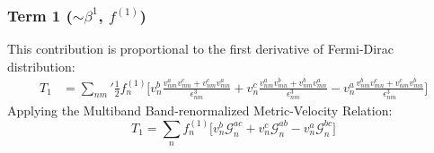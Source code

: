 \documentclass[twocolumn, prx, reprint, amsfonts, amsmath, amssymb, longbibliography, floatfix, aps]{revtex4-2}
\begin{document}
\subsubsection*{Term 1 (\texorpdfstring{$\sim \beta^1$}{beta1}, \texorpdfstring{$f^{(1)}$}{f1})}
This contribution is proportional to the first derivative of Fermi-Dirac distribution:
\begin{equation}
	\begin{aligned}
		T_1
		&= {\textstyle \sum_{nm}'}\frac{1}{2} f^{(1)}_n \Big[v^b_{n} \frac{v^a_{nm}v^c_{mn} + v^c_{nm}v^a_{mn}}{\epsilon_{nm}^3}  + v^c_{n} \frac{v^a_{nm}v^b_{mn} + v^b_{nm}v^a_{mn}}{\epsilon_{nm}^3} - v^a_{n} \frac{v^b_{nm}v^c_{mn} + v^c_{nm}v^b_{mn}}{\epsilon_{nm}^3} \Big]
	\end{aligned}
\end{equation}
Applying the Multiband Band-renormalized Metric-Velocity Relation:
\begin{equation}
	T_1 
	= {\textstyle \sum_{n}} f^{(1)}_n \Big[v^b_{n} \mathcal{G}^{ac}_{n}  + v^c_{n} \mathcal{G}^{ab}_{n} - v^a_{n} \mathcal{G}^{bc}_{n} \Big]
    \label{multiband-T1}
\end{equation}
\end{document}
